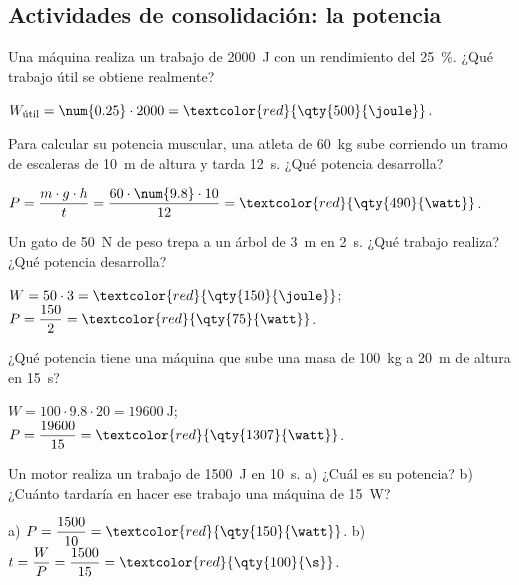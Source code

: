 \subsection*{Actividades de consolidación: la potencia}

\begin{exercise}
    Una máquina realiza un trabajo de \qty{2000}{\joule} con un rendimiento del \qty{25}{\percent}. ¿Qué trabajo útil se obtiene realmente?
    \begin{solu}
        \(W_{\text{útil}} = \num{0.25} \cdot 2000 = \textcolor{red}{\qty{500}{\joule}}\).
    \end{solu}
\end{exercise}

\begin{exercise}
    Para calcular su potencia muscular, una atleta de \qty{60}{\kg} sube corriendo un tramo de escaleras de \qty{10}{\m} de altura y tarda \qty{12}{\s}. ¿Qué potencia desarrolla?
    \begin{solu}
        \(P = \dfrac{m \cdot g \cdot h}{t} = \dfrac{60 \cdot \num{9.8} \cdot 10}{12} = \textcolor{red}{\qty{490}{\watt}}\).
    \end{solu}
\end{exercise}

\begin{exercise}
    Un gato de \qty{50}{\newton} de peso trepa a un árbol de \qty{3}{\m} en \qty{2}{\s}. ¿Qué trabajo realiza? ¿Qué potencia desarrolla?
    \begin{solu}
        \(W = 50 \cdot 3 = \textcolor{red}{\qty{150}{\joule}}\); \(P = \dfrac{150}{2} = \textcolor{red}{\qty{75}{\watt}}\).
    \end{solu}
\end{exercise}

\begin{exercise}
    ¿Qué potencia tiene una máquina que sube una masa de \qty{100}{\kg} a \qty{20}{\m} de altura en \qty{15}{\s}?
    \begin{solu}
        \(W = 100 \cdot \num{9.8} \cdot 20 = \qty{19600}{\joule}\); \(P = \dfrac{19600}{15} = \textcolor{red}{\qty{1307}{\watt}}\).
    \end{solu}
\end{exercise}

\begin{exercise}
    Un motor realiza un trabajo de \qty{1500}{\joule} en \qty{10}{\s}. a) ¿Cuál es su potencia? b) ¿Cuánto tardaría en hacer ese trabajo una máquina de \qty{15}{\watt}?
    \begin{solu}
        a) \(P = \dfrac{1500}{10} = \textcolor{red}{\qty{150}{\watt}}\). b) \(t = \dfrac{W}{P} = \dfrac{1500}{15} = \textcolor{red}{\qty{100}{\s}}\).
    \end{solu}
\end{exercise}

